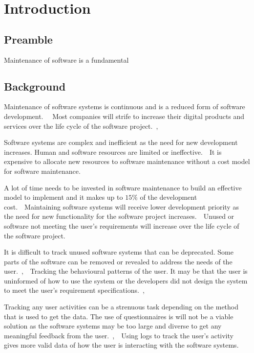 \chapter{Introduction}
\label{chap:1}

\section{Preamble}
Maintenance of software is a fundamental \cite{Levin2019}

\section{Background}

Maintenance of software systems is continuous and is a reduced form of software
development.~\cite{Sneed2004}~ Most companies will strife to increase their
digital products and services over the life cycle of the software
project.~\cite{Niu2018},~\cite{Galster2019}\par Software systems are complex and
inefficient as the need for new development increases. Human and software
resources are limited or ineffective.~\cite{Pecchia2015}~It is expensive to
allocate new resources to software maintenance without a cost model for software
maintenance.~\cite{Galster2019}\par A lot of time needs to be invested in
software maintenance to build an effective model to implement and it makes up to
$15\%$ of the development cost.~\cite{Lenarduzzi2017}~Maintaining software
systems will receive lower development priority as the need for new
functionality for the software project increases.~\cite{Sneed2004}~Unused or
software not meeting the user's requirements will increase over the life cycle
of the software project.~\cite{Thankachan2018}\par It is difficult to track
unused software systems that can be deprecated. Some parts of the software can
be removed or revealed to address the needs of the
user.~\cite{Dalpiaz2018},~\cite{Shahid2016}~Tracking the behavioural patterns of
the user. It may be that the user is uninformed of how to use the system or the
developers did not design the system to meet the user's requirement
specifications.~\cite{Slaninova2014},~\cite{Chen2019}\par Tracking any user
activities can be a strenuous task depending on the method that is used to get the
data. The use of questionnaires is will not be a viable solution as the software
systems may be too large and diverse to get any meaningful feedback from the
user.~\cite{Slaninova2014},~\cite{Waqar2017}~Using logs to track the user's
activity gives more valid data of how the user is interacting with the software
systems.~\cite{Lei2018}

